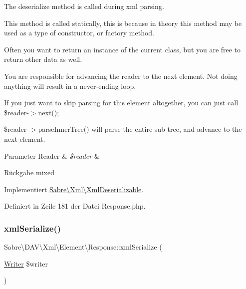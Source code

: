 The deserialize method is called during xml parsing.

This method is called statically, this is because in theory this method may be used as a type of constructor, or factory method.

Often you want to return an instance of the current class, but you are free to return other data as well.

You are responsible for advancing the reader to the next element. Not doing anything will result in a never-\/ending loop.

If you just want to skip parsing for this element altogether, you can just call \$reader-\/$>$next();

\$reader-\/$>$parse\+Inner\+Tree() will parse the entire sub-\/tree, and advance to the next element.


\begin{DoxyParams}[1]{Parameter}
Reader & {\em \$reader} & \\
\hline
\end{DoxyParams}
\begin{DoxyReturn}{Rückgabe}
mixed 
\end{DoxyReturn}


Implementiert \mbox{\hyperlink{interface_sabre_1_1_xml_1_1_xml_deserializable_a19e0eca545b9a0d93f7d6b69085ade30}{Sabre\textbackslash{}\+Xml\textbackslash{}\+Xml\+Deserializable}}.



Definiert in Zeile 181 der Datei Response.\+php.

\mbox{\label{class_sabre_1_1_d_a_v_1_1_xml_1_1_element_1_1_response_ab0849b6aace12b8039ca08461af88f69}} 
\subsubsection{\texorpdfstring{xml\+Serialize()}{xmlSerialize()}}
{\footnotesize\ttfamily Sabre\textbackslash{}\+D\+A\+V\textbackslash{}\+Xml\textbackslash{}\+Element\textbackslash{}\+Response\+::xml\+Serialize (\begin{DoxyParamCaption}\item[{\mbox{\hyperlink{class_sabre_1_1_xml_1_1_writer}{Writer}}}]{\$writer }\end{DoxyParamCaption})}

